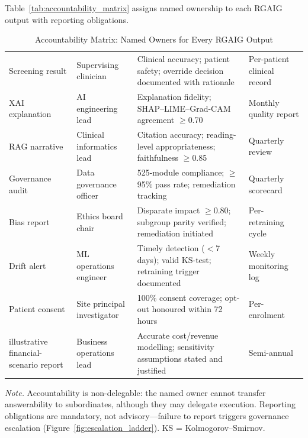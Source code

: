 Table~\ref{tab:accountability_matrix} assigns named ownership to each RGAIG output with reporting obligations.

\begin{table}[!htbp]
\tablestripes
\tablefontsize
\caption[Accountability Matrix]{Accountability Matrix: Named Owners for Every RGAIG Output}
\begin{tabularx}{\textwidth}{@{} p{2cm} p{2.5cm} L p{2.5cm} @{}}
\toprule
{} &  &  &  \\
\midrule
Screening result & Supervising clinician & Clinical accuracy; patient safety; override decision documented with rationale & Per-patient clinical record \\
\addlinespace
XAI explanation & AI engineering lead & Explanation fidelity; SHAP--LIME--Grad-CAM agreement $\geq$0.70 & Monthly quality report \\
\addlinespace
RAG narrative & Clinical informatics lead & Citation accuracy; reading-level appropriateness; faithfulness $\geq$0.85 & Quarterly review \\
\addlinespace
Governance audit & Data governance officer & 525-module compliance; $\geq$95\% pass rate; remediation tracking & Quarterly scorecard \\
\addlinespace
Bias report & Ethics board chair & Disparate impact $\geq$0.80; subgroup parity verified; remediation initiated & Per-retraining cycle \\
\addlinespace
Drift alert & ML operations engineer & Timely detection ($<$7 days); valid KS-test; retraining trigger documented & Weekly monitoring log \\
\addlinespace
Patient consent & Site principal investigator & 100\% consent coverage; opt-out honoured within 72 hours & Per-enrolment \\
\addlinespace
illustrative financial-scenario report & Business operations lead & Accurate cost/revenue modelling; sensitivity assumptions stated and justified & Semi-annual \\
\bottomrule
\end{tabularx}
\vspace{0.5em}\noindent\textit{Note.} Accountability is non-delegable: the named owner cannot transfer answerability to subordinates, although they may delegate execution. Reporting obligations are mandatory, not advisory---failure to report triggers governance escalation (Figure~\ref{fig:escalation_ladder}). KS = Kolmogorov--Smirnov.
\end{table}
\fi

